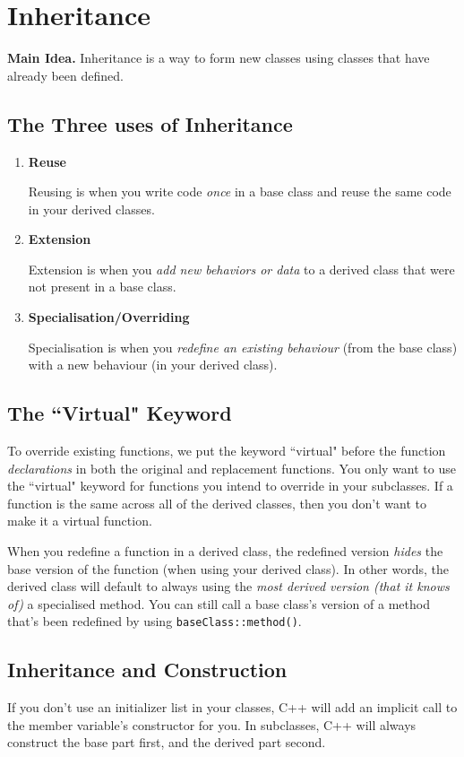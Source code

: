 \documentclass[class=article, crop=false]{standalone}
\begin{document}
  \section{Inheritance}
  \textbf{Main Idea.} Inheritance is a way to form new classes using classes that have already been defined.
  \subsection{The Three uses of Inheritance}
  \begin{enumerate}
    \item \textbf{Reuse} \par
    Reusing is when you write code \emph{once} in a base class and reuse the same code in your derived classes.
    \item \textbf{Extension} \par
    Extension is when you \emph{add new behaviors or data} to a derived class that were not present in a base class.
    \item \textbf{Specialisation/Overriding} \par
    Specialisation is when you \emph{redefine an existing behaviour} (from the base class) with a new behaviour (in your derived class).
  \end{enumerate}
  \subsection{The ``Virtual" Keyword}
  To override existing functions, we put the keyword ``virtual" before the function \emph{declarations} in both the original and replacement functions. You only want to use the ``virtual" keyword for functions you intend to override in your subclasses. If a function is the same across all of the derived classes, then you don't want to make it a virtual function. \par
  When you redefine a function in a derived class, the redefined version \emph{hides} the base version of the function (when using your derived class). In other words, the derived class will default to always using the \emph{most derived version (that it knows of)} a specialised method. You can still call a base class's version of a method that's been redefined by using \texttt{baseClass::method()}.
  \subsection{Inheritance and Construction}
  If you don't use an initializer list in your classes, C++ will add an implicit call to the member variable's constructor for you. In subclasses, C++ will always construct the base part first, and the derived part second.
\end{document}
